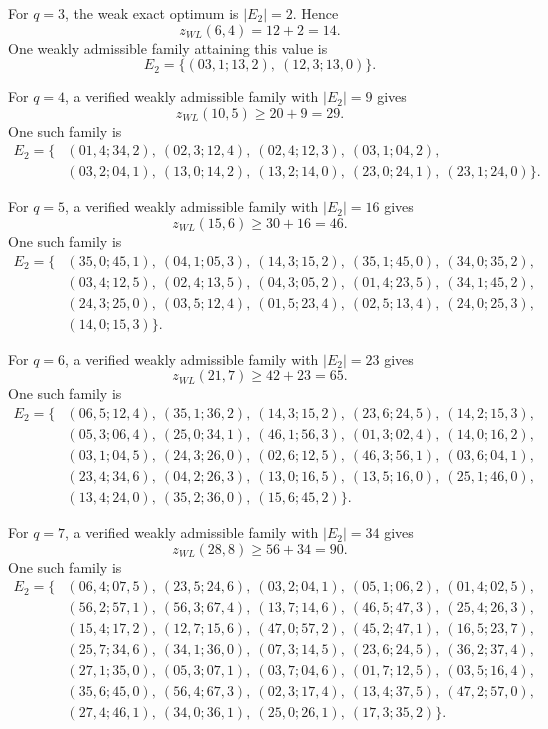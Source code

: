 \documentclass[10pt]{article}
\newcommand{\blue}[1]{#1}
\newcommand{\0}{\mathbf{0}}
\newcommand{\1}{\mathbf{1}}
\begin{document}
For \(q=3\), the weak exact optimum is \(|E_2|=2\). Hence
\[
z_{WL}(6,4)=12+2=14.
\]
\blue{One weakly admissible family attaining this value is}
\[
\blue{E_2=\{(03,1;13,2),\ (12,3;13,0)\}.}
\]

For \(q=4\), a verified weakly admissible family with \(|E_2|=9\) gives
\[
z_{WL}(10,5)\ge 20+9=29.
\]
\blue{One such family is}
\[
\blue{\begin{aligned}
E_2=\{&(01,4;34,2),\ (02,3;12,4),\ (02,4;12,3),\ (03,1;04,2),\\
&(03,2;04,1),\ (13,0;14,2),\ (13,2;14,0),\ (23,0;24,1),\ (23,1;24,0)\}.
\end{aligned}}
\]

For \(q=5\), a verified weakly admissible family with \(|E_2|=16\) gives
\[
z_{WL}(15,6)\ge 30+16=46.
\]
\blue{One such family is}
\[
\blue{\begin{aligned}
E_2=\{&(35,0;45,1),\ (04,1;05,3),\ (14,3;15,2),\ (35,1;45,0),\ (34,0;35,2),\\
&(03,4;12,5),\ (02,4;13,5),\ (04,3;05,2),\ (01,4;23,5),\ (34,1;45,2),\\
&(24,3;25,0),\ (03,5;12,4),\ (01,5;23,4),\ (02,5;13,4),\ (24,0;25,3),\\
&(14,0;15,3)\}.
\end{aligned}}
\]

For \(q=6\), a verified weakly admissible family with \(|E_2|=23\) gives
\[
z_{WL}(21,7)\ge 42+23=65.
\]
\blue{One such family is}
\[
\blue{\begin{aligned}
E_2=\{&(06,5;12,4),\ (35,1;36,2),\ (14,3;15,2),\ (23,6;24,5),\ (14,2;15,3),\\
&(05,3;06,4),\ (25,0;34,1),\ (46,1;56,3),\ (01,3;02,4),\ (14,0;16,2),\\
&(03,1;04,5),\ (24,3;26,0),\ (02,6;12,5),\ (46,3;56,1),\ (03,6;04,1),\\
&(23,4;34,6),\ (04,2;26,3),\ (13,0;16,5),\ (13,5;16,0),\ (25,1;46,0),\\
&(13,4;24,0),\ (35,2;36,0),\ (15,6;45,2)\}.
\end{aligned}}
\]

For \(q=7\), a verified weakly admissible family with \(|E_2|=34\) gives
\[
z_{WL}(28,8)\ge 56+34=90.
\]
\blue{One such family is}
\[
\blue{\begin{aligned}
E_2=\{&(06,4;07,5),\ (23,5;24,6),\ (03,2;04,1),\ (05,1;06,2),\ (01,4;02,5),\\
&(56,2;57,1),\ (56,3;67,4),\ (13,7;14,6),\ (46,5;47,3),\ (25,4;26,3),\\
&(15,4;17,2),\ (12,7;15,6),\ (47,0;57,2),\ (45,2;47,1),\ (16,5;23,7),\\
&(25,7;34,6),\ (34,1;36,0),\ (07,3;14,5),\ (23,6;24,5),\ (36,2;37,4),\\
&(27,1;35,0),\ (05,3;07,1),\ (03,7;04,6),\ (01,7;12,5),\ (03,5;16,4),\\
&(35,6;45,0),\ (56,4;67,3),\ (02,3;17,4),\ (13,4;37,5),\ (47,2;57,0),\\
&(27,4;46,1),\ (34,0;36,1),\ (25,0;26,1),\ (17,3;35,2)\}.
\end{aligned}}
\]
\end{document}
